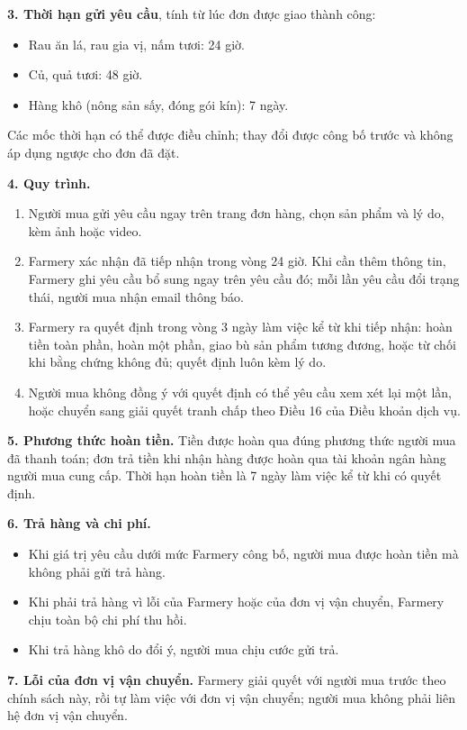 \noindent\textbf{3. Thời hạn gửi yêu cầu}, tính từ lúc đơn được giao thành công:
\begin{itemize}
    \item Rau ăn lá, rau gia vị, nấm tươi: 24 giờ.
    \item Củ, quả tươi: 48 giờ.
    \item Hàng khô (nông sản sấy, đóng gói kín): 7 ngày.
\end{itemize}
Các mốc thời hạn có thể được điều chỉnh; thay đổi được công bố trước và không
áp dụng ngược cho đơn đã đặt.

\noindent\textbf{4. Quy trình.}
\begin{enumerate}
    \item Người mua gửi yêu cầu ngay trên trang đơn hàng, chọn sản phẩm và lý
    do, kèm ảnh hoặc video.
    \item Farmery xác nhận đã tiếp nhận trong vòng 24 giờ. Khi cần thêm
    thông tin, Farmery ghi yêu cầu bổ sung ngay trên yêu cầu đó; mỗi lần yêu
    cầu đổi trạng thái, người mua nhận email thông báo.
    \item Farmery ra quyết định trong vòng 3 ngày làm việc kể từ khi tiếp nhận:
    hoàn tiền toàn phần, hoàn một phần, giao bù sản phẩm tương đương, hoặc từ
    chối khi bằng chứng không đủ; quyết định luôn kèm lý do.
    \item Người mua không đồng ý với quyết định có thể yêu cầu xem xét lại một
    lần, hoặc chuyển sang giải quyết tranh chấp theo Điều 16 của Điều khoản
    dịch vụ.
\end{enumerate}

\noindent\textbf{5. Phương thức hoàn tiền.} Tiền được hoàn qua đúng phương
thức người mua đã thanh toán; đơn trả tiền khi nhận hàng được hoàn qua tài
khoản ngân hàng người mua cung cấp. Thời hạn hoàn tiền là 7 ngày làm việc kể
từ khi có quyết định.

\noindent\textbf{6. Trả hàng và chi phí.}
\begin{itemize}
    \item Khi giá trị yêu cầu dưới mức Farmery công bố, người mua được hoàn
    tiền mà không phải gửi trả hàng.
    \item Khi phải trả hàng vì lỗi của Farmery hoặc của đơn vị vận chuyển,
    Farmery chịu toàn bộ chi phí thu hồi.
    \item Khi trả hàng khô do đổi ý, người mua chịu cước gửi trả.
\end{itemize}

\noindent\textbf{7. Lỗi của đơn vị vận chuyển.} Farmery giải quyết với người
mua trước theo chính sách này, rồi tự làm việc với đơn vị vận chuyển; người
mua không phải liên hệ đơn vị vận chuyển.

